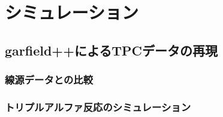 \chapter{シミュレーション}
\section{garfield++によるTPCデータの再現}
\subsection{線源データとの比較}
\subsection{トリプルアルファ反応のシミュレーション}
